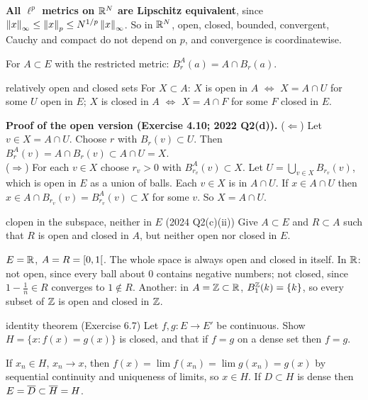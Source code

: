 \textbf{All $\ell^p$ metrics on $\mathbb R^N$ are Lipschitz equivalent}, since
$\left\lVert x\right\rVert_\infty\le\left\lVert x\right\rVert_p\le N^{1/p}\left\lVert x\right\rVert_\infty$. So in $\mathbb R^N$, open, closed, bounded,
convergent, Cauchy and compact do not depend on $p$, and convergence is coordinatewise.

For $A\subset E$ with the restricted metric: $B^A_r(a)=A\cap B_r(a)$.
\begin{thm}{relatively open and closed sets}
For $X\subset A$: $X$ is open in $A$ $\iff$ $X=A\cap U$ for some $U$ open in $E$;
$X$ is closed in $A$ $\iff$ $X=A\cap F$ for some $F$ closed in $E$.
\end{thm}
\begin{answer}
\textbf{Proof of the open version (Exercise 4.10; 2022 Q2(d)).}
($\Leftarrow$) Let $v\in X=A\cap U$. Choose $r$ with $B_r(v)\subset U$. Then
$B^A_r(v)=A\cap B_r(v)\subset A\cap U=X$.\\
($\Rightarrow$) For each $v\in X$ choose $r_v>0$ with $B^A_{r_v}(v)\subset X$. Let
$U=\bigcup_{v\in X}B_{r_v}(v)$, which is open in $E$ as a union of balls. Each $v\in X$ is in
$A\cap U$. If $x\in A\cap U$ then $x\in A\cap B_{r_v}(v)=B^A_{r_v}(v)\subset X$ for some $v$.
So $X=A\cap U$.
\end{answer}

\begin{exam}{clopen in the subspace, neither in $E$ (2024 Q2(c)(ii))}
Give $A\subset E$ and $R\subset A$ such that $R$ is open and closed in $A$, but neither open nor
closed in $E$.
\end{exam}
\begin{answer}
$E=\mathbb R$, $A=R=\mathopen{[}0,1\mathclose{[}$. The whole space is always open and closed in itself. In $\mathbb R$: not open,
since every ball about $0$ contains negative numbers; not closed, since $1-\frac1n\in R$
converges to $1\notin R$.
Another: in $A=\mathbb Z\subset\mathbb R$, $B^{\mathbb Z}_1(k)=\{k\}$, so every subset of $\mathbb Z$ is open and closed in
$\mathbb Z$.
\end{answer}

\begin{exam}{identity theorem (Exercise 6.7)}
Let $f,g:E\to E'$ be continuous. Show $H=\{x: f(x)=g(x)\}$ is closed, and that if $f=g$ on a
dense set then $f=g$.
\end{exam}
\begin{answer}
If $x_n\in H$, $x_n\to x$, then $f(x)=\lim f(x_n)=\lim g(x_n)=g(x)$ by sequential continuity and
uniqueness of limits, so $x\in H$. If $D\subset H$ is dense then $E=\overline{D}\subset\overline{H}=H$.
\end{answer}

